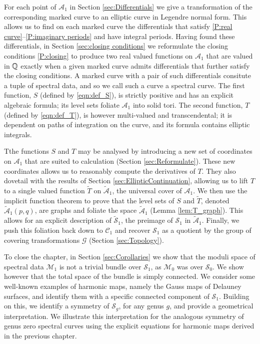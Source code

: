 For each point of $\mathcal{A}_1$ in Section \ref{sec:Differentials} we give a transformation of the corresponding marked curve to an elliptic curve in Legendre normal form. This allows us to find on each marked curve the differentials that satisfy \ref{P:real curve}--\ref{P:imaginary periods} and have integral periods. Having found these differentials, in Section \ref{sec:closing conditions} we reformulate the closing conditions \ref{P:closing} to produce two real valued functions on $\mathcal{A}_1$ that are valued in $\Q$ exactly when a given marked curve admits differentials that further satisfy the closing conditions. A marked curve with a pair of such differentials consitute a tuple of spectral data, and so we call such a curve a spectral curve. The first function, $S$ (defined by \eqref{eqn:def_S}), is strictly positive and has an explicit algebraic formula; its level sets foliate $\mathcal{A}_1$ into solid tori. The second function, $T$ (defined by \eqref{eqn:def_T}), is however multi-valued and transcendental; it is dependent on paths of integration on the curve, and its formula contains elliptic integrals.

Tthe functions $S$ and $T$ may be analysed by introducing a new set of coordinates on $\mathcal{A}_1$ that are suited to calculation (Section \ref{sec:Reformulate}).
These new coordinates allows us to reasonably compute the derivatives of $T$. They also dovetail with the results of Section \ref{sec:EllipticContinuation}, allowing us to lift $T$ to a  single valued function $\tilde{T}$ on $\mathcal{\tilde{A}}_1$, the universal cover of $\mathcal{A}_1$.
We then use the implicit function theorem to prove that the level sets of $S$ and $\tilde{T}$, denoted $\mathcal{\tilde{A}}_1(p,q)$, are graphs and foliate the space $\mathcal{\tilde{A}}_1$ (Lemma \ref{lem:T_graph}). This allows for an explicit description of $\mathcal{\tilde{S}}_1$, the preimage of $\mathcal{S}_1$ in $\mathcal{\tilde{A}}_1$.
Finally, we push this foliation back down to $\mathcal{C}_1$ and recover $\mathcal{S}_1$ as a quotient by the group of covering transformations $\mathcal{G}$ (Section \ref{sec:Topology}).

To close the chapter, in Section \ref{sec:Corollaries} we show that the moduli space of spectral data $\mathcal{M}_1$ is not a trivial bundle over $\mathcal{S}_1$, as $\mathcal{M}_0$ was over $\mathcal{S}_0$. We show however that the total space of the bundle is simply connected. We consider some well-known examples of harmonic maps, namely the Gauss maps of Delauney surfaces, and identify them with a specific connected component of $\mathcal{S}_1$. Building on this, we identify a symmetry of $\mathcal{S}_g$, for any genus $g$, and provide a geometrical interpretation. We illustrate this interpretation for the analogous symmetry of genus zero spectral curves using the explicit equations for harmonic maps derived in the previous chapter.

